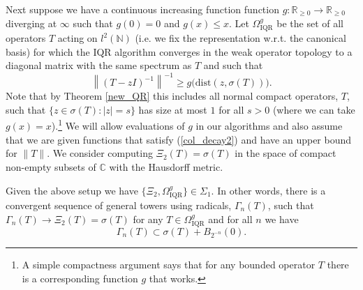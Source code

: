\documentclass[a4paper,10pt]{article}
\begin{document}
Next suppose we have a continuous increasing function function $g:\mathbb{R}_{\geq 0}\rightarrow\mathbb{R}_{\geq 0}$ diverging at $\infty$ such that $g(0)=0$ and $g(x)\leq x$. Let $\Omega_{\mathrm{IQR}}^g$ be the set of all operators $T$ acting on $l^2(\mathbb{N})$ (i.e. we fix the representation w.r.t. the canonical basis) for which the IQR algorithm converges in the weak operator topology to a diagonal matrix with the same spectrum as $T$ and such that
$$
\left\|(T-zI)^{-1}\right\|^{-1}\geq g\big(\mathrm{dist}(z,\sigma(T))\big).
$$
Note that by Theorem \ref{new_QR} this includes all normal compact operators, $T$, such that $\{z\in\sigma(T):\left|z\right|=s\}$ has size at most $1$ for all $s>0$ (where we can take $g(x)=x$).\footnote{A simple compactness argument says that for any bounded operator $T$ there is a corresponding function $g$ that works.} We will allow evaluations of $g$ in our algorithms and also assume that we are given functions that satisfy (\ref{col_decay2}) and have an upper bound for $\|T\|$. We consider computing $\Xi_2(T)=\sigma(T)$ in the space of compact non-empty subsets of $\mathbb{C}$ with the Hausdorff metric.

\begin{theorem}
\label{class2}
Given the above setup we have $\{\Xi_2,\Omega_{\mathrm{IQR}}^g\}\in \Sigma_1.$ In other words, there is a convergent sequence of general towers using radicals, $\Gamma_n(T)$, such that $\Gamma_n(T)\rightarrow\Xi_2(T)=\sigma(T)$ for any $T\in\Omega_{\mathrm{IQR}}^g$ and for all $n$ we have
$$
\Gamma_n(T)\subset \sigma(T)+B_{2^{-n}}(0).
$$
\end{theorem}
\end{document}
